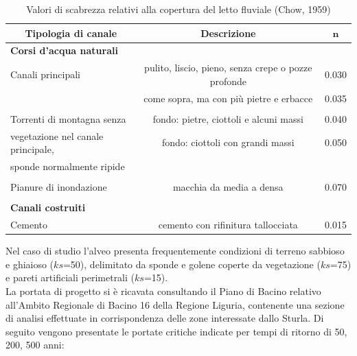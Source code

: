 \documentclass[12pt]{article} %
\begin{document}
\begin{table}[H]
    \centering
    \begin{tabular}{lcc}
        \hline
        \multicolumn{1}{c}{\textbf{Tipologia di canale}} & \textbf{Descrizione} & $\mathbf{n}$  \\
        \hline
        \textbf{Corsi d'acqua naturali} & &\\
        \hspace{1.5pt} Canali principali & pulito, liscio, pieno, senza crepe o pozze profonde & 0.030\\
        & come sopra, ma con più pietre e erbacce &  0.035\\
        [-1em]\\
        \hspace{1.5pt} Torrenti di montagna senza & fondo: pietre, ciottoli e alcuni massi & 0.040\\
        \hspace{1.5pt} vegetazione nel canale principale, & fondo: ciottoli con grandi massi & 0.050\\
        \hspace{1.5pt} sponde normalmente ripide & &\\
        [-1em]\\
        \hspace{1.5pt} Pianure di inondazione & macchia da media a densa & 0.070\\
        [-1em]\\
        \textbf{Canali costruiti} & &\\
        \hspace{1.5pt} Cemento & cemento con rifinitura tallocciata & 0.015\\
        \hline
    \end{tabular}
    \caption{Valori di scabrezza relativi alla copertura del letto fluviale (Chow, 1959)}
    \label{tab:Manning_alvei}
\end{table}

\noindent Nel caso di studio l'alveo presenta frequentemente condizioni di terreno sabbioso e ghiaioso ($ks$=50), delimitato da sponde e golene coperte da vegetazione ($ks$=75) e pareti artificiali perimetrali ($ks$=15).\\
La portata di progetto si è ricavata consultando il Piano di Bacino relativo all'Ambito Regionale di Bacino 16 della Regione Liguria, contenente una sezione di analisi effettuate in corrispondenza delle zone interessate dallo Sturla. Di seguito vengono presentate le portate critiche indicate per tempi di ritorno di 50, 200, 500 anni:
\end{document}

